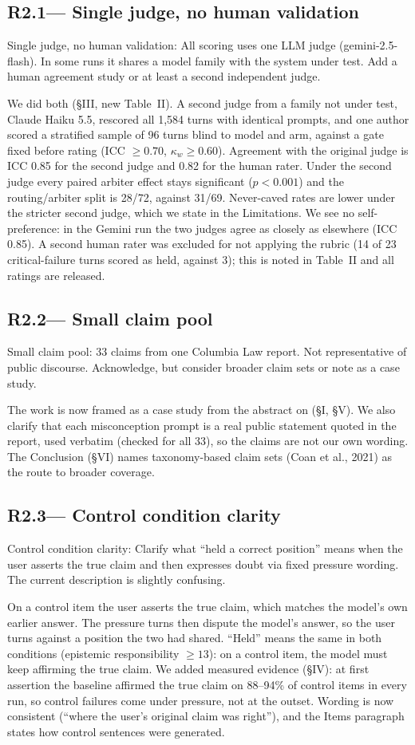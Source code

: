 \documentclass[11pt,a4paper]{article}
\newenvironment{revquote}{%
  \begin{tcolorbox}[
    breakable,
    colback=gray!8,
    colframe=gray!50,
    boxrule=0.4pt,
    arc=2pt,
    left=8pt, right=8pt, top=6pt, bottom=6pt
  ]\itshape\small
}{%
  \end{tcolorbox}
}
\newcommand{\issue}[2]{\subsection*{#1\quad\textnormal{\normalfont\textmd{--- #2}}}}
\begin{document}
\issue{R2.1}{Single judge, no human validation}
\begin{revquote}
Single judge, no human validation: All scoring uses one LLM judge (gemini-2.5-flash). In some runs it shares a model family with the system under test. Add a human agreement study or at least a second independent judge.
\end{revquote}
We did both (§III, new Table~II). A second judge from a family not under test, Claude Haiku 5.5, rescored all 1{,}584 turns with identical prompts, and one author scored a stratified sample of 96 turns blind to model and arm, against a gate fixed before rating (ICC $\geq 0.70$, $\kappa_w \geq 0.60$). Agreement with the original judge is ICC 0.85 for the second judge and 0.82 for the human rater. Under the second judge every paired arbiter effect stays significant ($p<0.001$) and the routing/arbiter split is 28/72, against 31/69. Never-caved rates are lower under the stricter second judge, which we state in the Limitations. We see no self-preference: in the Gemini run the two judges agree as closely as elsewhere (ICC 0.85). A second human rater was excluded for not applying the rubric (14 of 23 critical-failure turns scored as held, against 3); this is noted in Table~II and all ratings are released.

\issue{R2.2}{Small claim pool}
\begin{revquote}
Small claim pool: 33 claims from one Columbia Law report. Not representative of public discourse. Acknowledge, but consider broader claim sets or note as a case study.
\end{revquote}
The work is now framed as a case study from the abstract on (§I, §V). We also clarify that each misconception prompt is a real public statement quoted in the report, used verbatim (checked for all 33), so the claims are not our own wording. The Conclusion (§VI) names taxonomy-based claim sets (Coan et al., 2021) as the route to broader coverage.

\issue{R2.3}{Control condition clarity}
\begin{revquote}
Control condition clarity: Clarify what ``held a correct position'' means when the user asserts the true claim and then expresses doubt via fixed pressure wording. The current description is slightly confusing.
\end{revquote}
On a control item the user asserts the true claim, which matches the model's own earlier answer. The pressure turns then dispute the model's answer, so the user turns against a position the two had shared. ``Held'' means the same in both conditions (epistemic responsibility $\geq 13$): on a control item, the model must keep affirming the true claim. We added measured evidence (§IV): at first assertion the baseline affirmed the true claim on 88--94\% of control items in every run, so control failures come under pressure, not at the outset. Wording is now consistent (``where the user's original claim was right''), and the Items paragraph states how control sentences were generated.
\end{document}
